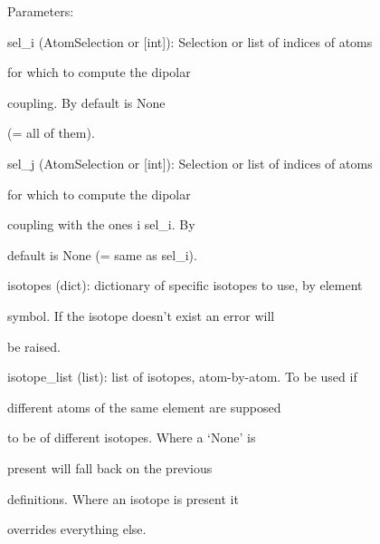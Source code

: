 \documentclass[letterpaper,10pt,english]{sphinxmanual}
\begin{document}
\begin{fulllineitems}
\begin{DUlineblock}{0em}
\item[] Parameters:
\item[]
\begin{DUlineblock}{\DUlineblockindent}
\item[] sel\_i (AtomSelection or {[}int{]}): Selection or list of indices of atoms
\item[]
\begin{DUlineblock}{\DUlineblockindent}
\item[] for which to compute the dipolar
\item[] coupling. By default is None
\item[] (= all of them).
\end{DUlineblock}
\item[] sel\_j (AtomSelection or {[}int{]}): Selection or list of indices of atoms
\item[]
\begin{DUlineblock}{\DUlineblockindent}
\item[] for which to compute the dipolar
\item[] coupling with the ones i sel\_i. By
\item[] default is None (= same as sel\_i).
\end{DUlineblock}
\item[] isotopes (dict): dictionary of specific isotopes to use, by element
\item[]
\begin{DUlineblock}{\DUlineblockindent}
\item[] symbol. If the isotope doesn't exist an error will
\item[] be raised.
\end{DUlineblock}
\item[] isotope\_list (list): list of isotopes, atom-by-atom. To be used if
\item[]
\begin{DUlineblock}{\DUlineblockindent}
\item[] different atoms of the same element are supposed
\item[] to be of different isotopes. Where a `None' is
\item[] present will fall back on the previous
\item[] definitions. Where an isotope is present it
\item[] overrides everything else.
\end{DUlineblock}
\end{DUlineblock}
\end{DUlineblock}


\end{fulllineitems}
\end{document}
